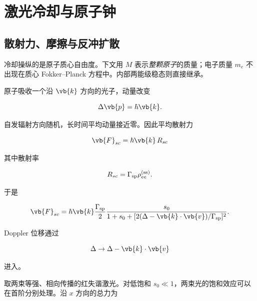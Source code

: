 \section{激光冷却与原子钟}
\label{ch:laser-cooling-clock}

\subsection{散射力、摩擦与反冲扩散}

冷却操纵的是原子质心自由度。下文用 $M$ 表示\emph{整颗原子}的质量；电子质量 $m_e$ 不出现在质心 Fokker--Planck 方程中。内部两能级稳态则直接继承。

原子吸收一个沿 \(\vb{k}\) 方向的光子，动量改变

\[
\Delta\vb{p}=\hbar\vb{k}.
\]

自发辐射方向随机，长时间平均动量接近零。因此平均散射力

\[
\vb{F}_{sc}=\hbar\vb{k}\,R_{sc}
\]

其中散射率

\[
R_{sc}=\Gamma_{\rm sp}\rho_{ee}^{(\rm ss)}.
\]

于是

\[
\vb{F}_{sc}
=\hbar\vb{k}\frac{\Gamma_{\rm sp}}2
\frac{s_0}{1+s_0+[2(\Delta-\vb{k}\cdot\vb{v})/\Gamma_{\rm sp}]^2}
.
\]

Doppler 位移通过

\[
\Delta\rightarrow\Delta-\vb{k}\cdot\vb{v}
\]

进入。

取两束等强、相向传播的红失谐激光。对低饱和 \(s_0\ll1\)，两束光的饱和效应可以在首阶分别处理。沿 \(x\) 方向的总力为

